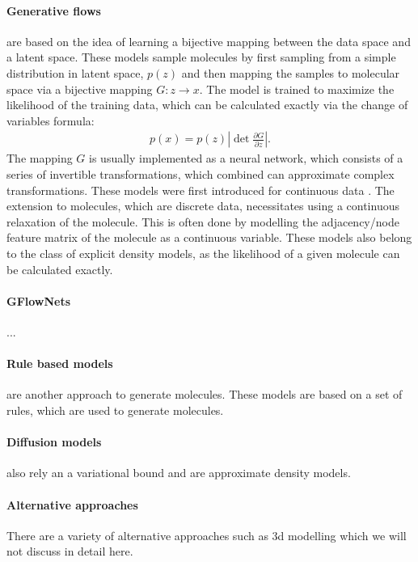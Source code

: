 \paragraph{Generative flows} are based on the idea of learning a bijective
mapping between the data space and a latent space. These 
models sample molecules by first sampling from a simple distribution in latent
space, $p(z)$ and then mapping the samples to molecular space via a
bijective mapping $G: z \rightarrow x$. The model is trained to maximize the
likelihood of the training data, which can be calculated exactly via 
the change of variables formula:
\begin{align}
    p(x) = p(z) \left| \det \frac{\partial G}{\partial z} \right|.
\end{align}
The mapping $G$ is usually implemented as a neural network, which consists
of a series of invertible transformations, which combined can approximate 
complex transformations. These models were first introduced for continuous data
\citet{rezendeVariationalInferenceNormalizing2016}. The extension to molecules,
which are discrete data, necessitates using a continuous relaxation of the
molecule. This is often done by modelling the adjacency/node feature matrix of
the molecule as a continuous variable. These models also belong to the class of
explicit density models, as the likelihood of a given molecule can be calculated
exactly.

\paragraph{GFlowNets} ...

\paragraph{Rule based models} are another approach to generate molecules. These
models are based on a set of rules, which are used to generate molecules.

\paragraph{Diffusion models} also rely an a variational bound and are approximate
density models.

\paragraph{Alternative approaches} There are a variety of alternative approaches
such as 3d modelling which we will not discuss in detail here.
    
